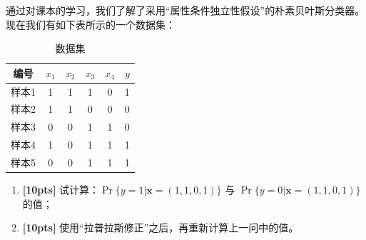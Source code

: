 \documentclass[a4paper,UTF8]{article}
\numberwithin{equation}{section}
\begin{document}
	通过对课本的学习，我们了解了采用“属性条件独立性假设”的朴素贝叶斯分类器。现在我们有如下表所示的一个数据集：
	\begin{table}[htp]
		\centering
		\caption{数据集}\label{tab:aStrangeTable}
	\begin{tabular}{c|ccccc}
		\hline 
	编号	& $x_1$ & $x_2$ & $x_3$ & $x_4$ & $y$ \\ 
		\hline 
	样本1	& 1 & 1 & 1 & 0 & 1 \\ 
		\hline 
	样本2	& 1 & 1 & 0 & 0 & 0 \\ 
		\hline 
	样本3	& 0 & 0 & 1 & 1 & 0 \\ 
		\hline 
	样本4	& 1 & 0 & 1 & 1 & 1 \\ 
		\hline 
	样本5	& 0 & 0 & 1 & 1 & 1 \\ 
		\hline 
	\end{tabular}
	\end{table} 
	
	\begin{enumerate}[ {(}1{)}]
		\item \textbf{[10pts]} 试计算：$\Pr\{ y=1 | \mathbf{x}=(1,1,0,1) \}$ 与 $\Pr\{ y=0 | \mathbf{x}=(1,1,0,1) \}$ 的值；
		\item \textbf{[10pts]} 使用“拉普拉斯修正”之后，再重新计算上一问中的值。
	\end{enumerate}
	
\end{document}
